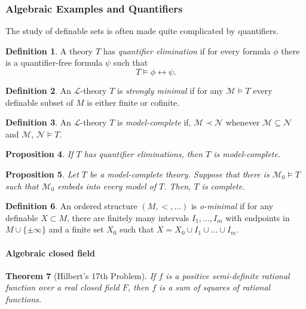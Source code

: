 \documentclass{amsart}
\newtheorem{theorem}{Theorem}[section]
\newtheorem{proposition}[theorem]{Proposition}
\theoremstyle{definition}
\newtheorem{definition}[theorem]{Definition}
\numberwithin{equation}{section}
\begin{document}
\subsubsection{Algebraic Examples and Quantifiers}
The study of definable sets is often made quite complicated by quantifiers.

\begin{definition}
    A theory $T$ has \emph{quantifier elimination} if for every formula $\phi$ there is a quantifier-free formula $\psi$ such that 
    \[
    T \models \phi \leftrightarrow \psi.
    \]
\end{definition}

\begin{definition}
    An $\mathcal{L}$-theory $T$ is \emph{strongly minimal} if for any $\mathcal{M} \models T$ every definable subset of $M$ is either finite or cofinite.
\end{definition}

\begin{definition}
    An $\mathcal{L}$-theory $T$ is \emph{model-complete} if, 
    $\mathcal{M} \prec \mathcal{N}$ whenever
    $\mathcal{M} \subseteq \mathcal{N}$  and $\mathcal{M}$, $\mathcal{N} \models T$.
\end{definition}

\begin{proposition}
    If $T$ has quantifier eliminations,
    then $T$ is model-complete.
\end{proposition}

\begin{proposition}
    Let $T$ be a model-complete theory. 
    Suppose that there is $\mathcal{M}_0 \models T$ such that $\mathcal{M}_0$ embeds into every model of $T$. 
    Then, $T$ is complete.
\end{proposition}

\begin{definition}
    An ordered structure $(M,<,\dots)$ is \emph{o-minimal} if
    for any definable $X \subset M$,
    there are finitely many intervals $I_1,\dots,I_m$ with endpoints in $M \cup \{\pm\infty\}$ and a finite set $X_0$ such that $X = X_0 \cup I_1 \cup \dots \cup I_m$.
\end{definition}

\paragraph{Algebraic closed field}

\begin{theorem}[Hilbert's 17th Problem]
    If $f$ is a positive semi-definite rational function over a real closed field $F$,
    then $f$ is a sum of squares of rational functions.
\end{theorem}
\end{document}
